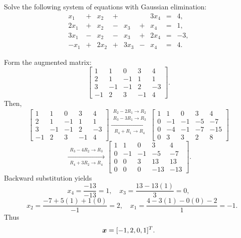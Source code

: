 \begin{example}
Solve the following system of equations with Gaussian elimination:
\[
\begin{array}{ccccccccc}
x_1&+&x_2&+& & &3x_4&=&4,\\
2x_1&+&x_2&-&x_3&+&x_4&=&1,\\
3x_1&-&x_2&-&x_3&+&2x_4&=&-3,\\
-x_1&+&2x_2&+&3x_3&-&x_4&=&4.
\end{array}
\]
\end{example}

\begin{solution}[8.0cm]
Form the augmented matrix:
\[
\left[
\begin{array}{rrrr|r}
1&1&0&3&4\\
2&1&-1&1&1\\
3&-1&-1&2&-3\\
-1&2&3&-1&4
\end{array}
\right].
\]
Then,
\[
\left[
\begin{array}{rrrr|r}
1&1&0&3&4\\
2&1&-1&1&1\\
3&-1&-1&2&-3\\
-1&2&3&-1&4
\end{array}
\right]
\xrightarrow[
  {\displaystyle
    \begin{array}{l}
      R_4+R_1\to R_4
    \end{array}}
]{
  \begin{array}{l}
    R_2-2R_1\to R_2\\
    R_3-3R_1\to R_3
  \end{array}
}
\left[
\begin{array}{rrrr|r}
1&1&0&3&4\\
0&-1&-1&-5&-7\\
0&-4&-1&-7&-15\\
0&3&3&2&8
\end{array}
\right]
\]
\[
    \xrightarrow[
  {\displaystyle
    \begin{array}{l}
      R_4+3R_2\to R_4
    \end{array}}
]{{\displaystyle
    \begin{array}{l}
      R_3-4R_2\to R_3
    \end{array}}
}
\left[
\begin{array}{rrrr|r}
1&1&0&3&4\\
0&-1&-1&-5&-7\\
0&0&3&13&13\\
0&0&0&-13&-13
\end{array}
\right].
\]
Backward substitution yields
\[
   x_4=\frac{-13}{-13}=1,
 \quad x_3=\frac{13-13(1)}{3}=0,
\]\[
 \quad x_2=\frac{-7+5(1)+1(0)}{-1}=2,
 \quad x_1=\frac{4-3(1)-0(0)-2}{1}=-1.
\]
Thus
\[
 \boldsymbol{x}=[-1,2,0,1]^T.
\]
\end{solution}

